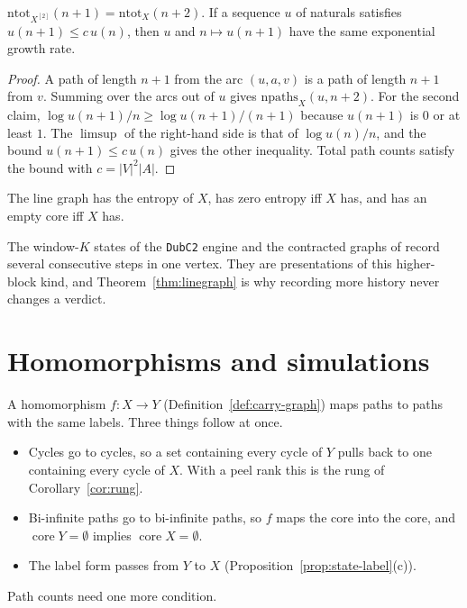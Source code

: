 \begin{lemma}\label{lem:shift}
\(\mathrm{ntot}_{X^{[2]}}(n+1)=\mathrm{ntot}_X(n+2)\). If a sequence \(u\) of naturals
satisfies \(u(n+1)\le c\,u(n)\), then \(u\) and \(n\mapsto u(n+1)\) have the same exponential
growth rate.
\end{lemma}

\begin{proof}
A path of length \(n+1\) from the arc \((u,a,v)\) is a path of length \(n+1\) from \(v\).
Summing over the arcs out of \(u\) gives \(\mathrm{npaths}_X(u,n+2)\). For the second claim,
\(\log u(n+1)/n\ge\log u(n+1)/(n+1)\) because \(u(n+1)\) is \(0\) or at least \(1\). The
\(\limsup\) of the right-hand side is that of \(\log u(n)/n\), and the bound \(u(n+1)\le c\,u(n)\)
gives the other inequality. Total path counts satisfy the bound with
\(c=|V|^2|A|\).
\end{proof}

\begin{theorem}\label{thm:linegraph}
The line graph has the entropy of \(X\), has zero entropy iff \(X\) has, and has an empty core
iff \(X\) has.
\end{theorem}

The window-\(K\) states of the \texttt{DubC2} engine and the contracted graphs of
\cite{Oda26} record several consecutive steps in one vertex. They are presentations of this
higher-block kind, and Theorem~\ref{thm:linegraph} is why recording more history never changes
a verdict.

\section{Homomorphisms and simulations}

A homomorphism \(f\colon X\to Y\) (Definition~\ref{def:carry-graph}) maps paths to paths with
the same labels. Three things follow at once.
\begin{itemize}
\item Cycles go to cycles, so a set containing every cycle of \(Y\) pulls back to one
  containing every cycle of \(X\). With a peel rank this is the rung of
  Corollary~\ref{cor:rung}.
\item Bi-infinite paths go to bi-infinite paths, so \(f\) maps the core into the core, and
  \(\operatorname{core}Y=\emptyset\) implies \(\operatorname{core}X=\emptyset\).
\item The label form passes from \(Y\) to \(X\) (Proposition~\ref{prop:state-label}(c)).
\end{itemize}
Path counts need one more condition.


